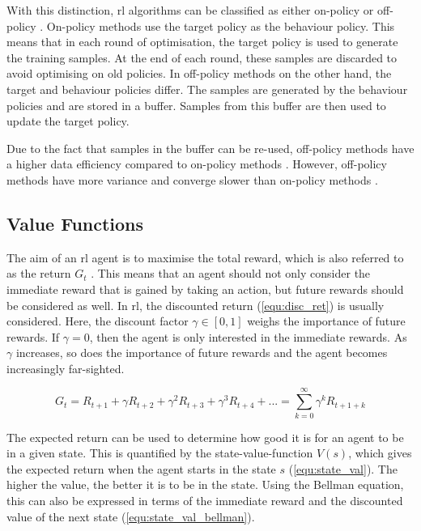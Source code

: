 With this distinction, \gls{rl} algorithms can be classified as either on-policy or off-policy \parencite{Wang_2022}. On-policy methods use the target policy as the behaviour policy. This means that in each round of optimisation, the target policy is used to generate the training samples. At the end of each round, these samples are discarded to avoid optimising on old policies.
In off-policy methods on the other hand, the target and behaviour policies differ. The samples are generated by the behaviour policies and are stored in a buffer. Samples from this buffer are then used to update the target policy.

Due to the fact that samples in the buffer can be re-used, off-policy methods have a higher data efficiency compared to on-policy methods \parencite{Wang_2022}. However, off-policy methods have more variance and converge slower than on-policy methods \parencite{SuttonBarto_2018}. 

\subsection{Value Functions}

The aim of an \gls{rl} agent is to maximise the total reward, which is also referred to as the return $G_t$ \parencite{SuttonBarto_2018}. This means that an agent should not only consider the immediate reward that is gained by taking an action, but future rewards should be considered as well. In \gls{rl}, the discounted return (\autoref{equ:disc_ret}) is usually considered. Here, the discount factor $\gamma \in [0, 1]$ weighs the importance of future rewards. If $\gamma = 0$, then the agent is only interested in the immediate rewards. As $\gamma$ increases, so does the importance of future rewards and the agent becomes increasingly far-sighted.

\begin{equation}
\label{equ:disc_ret}
G_t = R_{t+1} + \gamma R_{t+2} + \gamma^2 R_{t+3} + \gamma^3 R_{t+4} + ... = \sum^{\infty}_{k=0} \gamma^k R_{t+1+k}
\end{equation}

The expected return can be used to determine how good it is for an agent to be in a given state. This is quantified by the state-value-function $V(s)$, which gives the expected return when the agent starts in the state $s$ (\autoref{equ:state_val}). The higher the value, the better it is to be in the state. Using the Bellman equation, this can also be expressed in terms of the immediate reward and the discounted value of the next state (\autoref{equ:state_val_bellman}).

